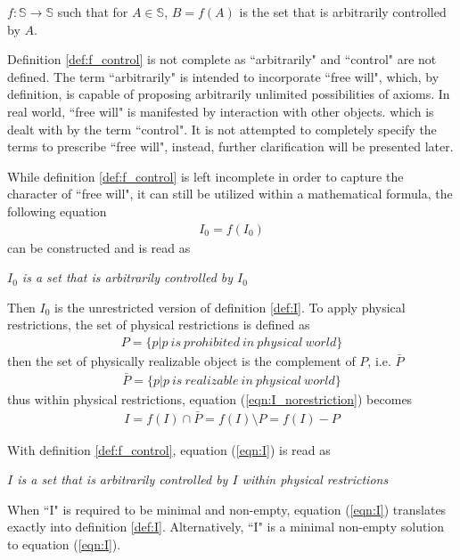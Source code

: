 \documentclass[final,leqno]{siamltex}
\begin{document}
\begin{definition}
\label{def:f_control}
$f:\mathbb{S}\rightarrow\mathbb{S}$ such that for $A\in\mathbb{S}$, $B=f(A)$ is the set that is arbitrarily controlled by $A$.
\end{definition}

Definition \ref{def:f_control} is not complete as ``arbitrarily" and ``control" are not defined. The term ``arbitrarily" is intended to incorporate ``free will", which, by definition, is capable of proposing arbitrarily unlimited possibilities of axioms. In real world, ``free will" is manifested by interaction with other objects.  which is dealt with by the term ``control". It is not attempted to completely specify the terms to prescribe ``free will", instead, further clarification will be presented later.

While definition \ref{def:f_control} is left incomplete in order to capture the character of ``free will", it can still be utilized within a mathematical formula, the following equation
\begin{eqnarray}
\label{eqn:I_norestriction}
I_0=f(I_0)
\end{eqnarray}
can be constructed and is read as

\emph{$I_0$ is a set that is arbitrarily controlled by $I_0$}

Then $I_0$ is the unrestricted version of definition \ref{def:I}. To apply physical restrictions, the set of physical restrictions is defined as
\begin{eqnarray}
P=\{p|p ~ is ~ prohibited ~ in ~ physical ~ world\}
\end{eqnarray}
then the set of physically realizable object is the complement of $P$, i.e. $\bar P$
\begin{eqnarray}
\bar P=\{p|p ~ is ~ realizable ~ in ~ physical ~ world\}
\end{eqnarray}
thus within physical restrictions, equation (\ref{eqn:I_norestriction}) becomes
\begin{eqnarray}
\label{eqn:I}
I=f(I)\cap \bar P=f(I)\setminus P=f(I)-P
\end{eqnarray}

With definition \ref{def:f_control}, equation (\ref{eqn:I}) is read as

\emph{$I$ is a set that is arbitrarily controlled by $I$ within physical restrictions}

When ``I" is required to be minimal and non-empty, equation (\ref{eqn:I}) translates exactly into definition \ref{def:I}. Alternatively, ``I" is a minimal non-empty solution to equation (\ref{eqn:I}).
\end{document}
